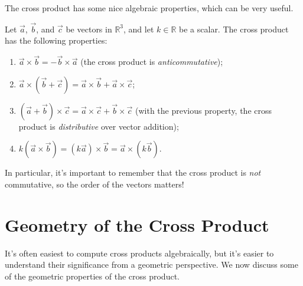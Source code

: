 \documentclass{ximera}
\begin{document}
The cross product has some nice algebraic properties, which can be very useful.

\begin{proposition}
Let $\vec{a}$, $\vec{b}$, and $\vec{c}$ be vectors in $\mathbb{R}^3$, and let $k\in\mathbb{R}$ be a scalar. The cross product has the following properties:
\begin{enumerate}
\item $\vec{a}\times \vec{b} = -\vec{b}\times \vec{a}$ (the cross product is \emph{anticommutative});
\item $\vec{a}\times(\vec{b}+\vec{c}) = \vec{a}\times\vec{b}+\vec{a}\times\vec{c}$;
\item $(\vec{a}+\vec{b})\times\vec{c} = \vec{a}\times\vec{c}+\vec{b}\times\vec{c}$ (with the previous property, the cross product is \emph{distributive} over vector addition);
\item $k(\vec{a}\times\vec{b})=(k\vec{a})\times\vec{b} = \vec{a}\times(k\vec{b})$.
\end{enumerate}
\end{proposition}

In particular, it's important to remember that the cross product is \emph{not} commutative, so the order of the vectors matters!

\section*{Geometry of the Cross Product}

It's often easiest to compute cross products algebraically, but it's easier to understand their significance from a geometric perspective. We now discuss some of the geometric properties of the cross product.
\end{document}

